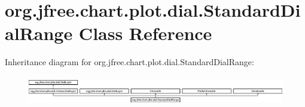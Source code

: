 \hypertarget{classorg_1_1jfree_1_1chart_1_1plot_1_1dial_1_1_standard_dial_range}{}\section{org.\+jfree.\+chart.\+plot.\+dial.\+Standard\+Dial\+Range Class Reference}
\label{classorg_1_1jfree_1_1chart_1_1plot_1_1dial_1_1_standard_dial_range}
Inheritance diagram for org.\+jfree.\+chart.\+plot.\+dial.\+Standard\+Dial\+Range\+:\begin{figure}[H]
\begin{center}
\leavevmode
\includegraphics[height=1.277567cm]{classorg_1_1jfree_1_1chart_1_1plot_1_1dial_1_1_standard_dial_range}
\end{center}
\end{figure}
